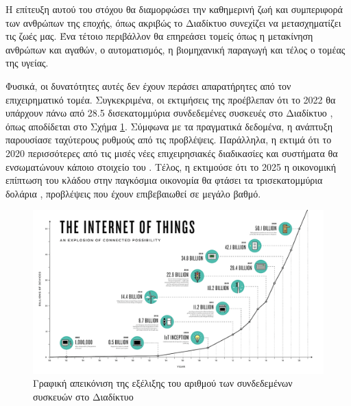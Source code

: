 \par
Η επίτευξη αυτού του στόχου θα διαμορφώσει την καθημερινή ζωή και συμπεριφορά των ανθρώπων της εποχής, όπως ακριβώς το Διαδίκτυο συνεχίζει να μετασχηματίζει τις ζωές μας.
Ένα τέτοιο περιβάλλον θα επηρεάσει τομείς όπως η μετακίνηση ανθρώπων και αγαθών, ο αυτοματισμός, η βιομηχανική παραγωγή και τέλος ο τομέας της υγείας.
\par
Φυσικά, οι δυνατότητες αυτές δεν έχουν περάσει απαρατήρητες από τον επιχειρηματικό τομέα.
Συγκεκριμένα, οι εκτιμήσεις της  προέβλεπαν ότι το 2022 θα υπάρχουν πάνω από 28.5 δισεκατομμύρια συνδεδεμένες συσκευές στο Διαδίκτυο \cite{cisco2019}, όπως αποδίδεται στο Σχήμα \ref{iotnumb}. Σύμφωνα με τα πραγματικά δεδομένα, η ανάπτυξη παρουσίασε ταχύτερους ρυθμούς από τις προβλέψεις.
Παράλληλα, η  εκτιμά ότι το 2020 περισσότερες από τις μισές νέες επιχειρησιακές διαδικασίες και συστήματα θα ενσωματώνουν κάποιο στοιχείο του  \cite{gartner2016}.
Τέλος, η  εκτιμούσε ότι το 2025 η οικονομική επίπτωση του κλάδου στην παγκόσμια οικονομία θα φτάσει τα τρισεκατομμύρια δολάρια \cite{mck2016}, προβλέψεις που έχουν επιβεβαιωθεί σε μεγάλο βαθμό.

\begin{figure}[h!]
\includegraphics[scale=0.4]{images/IOT_numbes.png}
\centering
\caption{Γραφική απεικόνιση της εξέλιξης του αριθμού των συνδεδεμένων συσκευών στο Διαδίκτυο \cite{iotnumb}}	
\label{iotnumb}
\end{figure}


